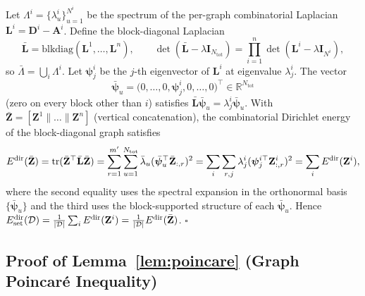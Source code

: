 Let $\Lambda^i=\{\lambda^i_u\}_{u=1}^{N^i}$ be the spectrum of the per-graph combinatorial Laplacian $\mathbf{L}^i=\mathbf{D}^i-\mathbf{A}^i$. Define the block-diagonal Laplacian
\begin{equation}
\bar{\mathbf{L}}=\mathrm{blkdiag}(\mathbf{L}^1,\dots,\mathbf{L}^n),\qquad \det(\bar{\mathbf{L}}-\lambda\mathbf{I}_{N_{\text{tot}}})=\prod_{i=1}^n\det(\mathbf{L}^i-\lambda\mathbf{I}_{N^i}),
\end{equation}
so $\bar{\Lambda}=\bigcup_i\Lambda^i$. Let $\bm{\psi}^i_j$ be the $j$-th eigenvector of $\mathbf{L}^i$ at eigenvalue $\lambda^i_j$. The vector
\begin{equation}
\bar{\bm{\psi}}_u=\bigl(0,\dots,0,\bm{\psi}^i_j,0,\dots,0\bigr)^\top\in\mathbb{R}^{N_{\text{tot}}}
\end{equation}
(zero on every block other than $i$) satisfies $\bar{\mathbf{L}}\bar{\bm{\psi}}_u=\lambda^i_j\bar{\bm{\psi}}_u$. With $\bar{\mathbf{Z}}=[\mathbf{Z}^1\|\dots\|\mathbf{Z}^n]$ (vertical concatenation), the combinatorial Dirichlet energy of the block-diagonal graph satisfies
\begin{equation}
E^{\text{dir}}(\bar{\mathbf{Z}})=\mathrm{tr}(\bar{\mathbf{Z}}^\top\bar{\mathbf{L}}\bar{\mathbf{Z}})=\sum_{r=1}^{m'}\sum_{u=1}^{N_{\text{tot}}}\bar{\lambda}_u(\bar{\bm{\psi}}_u^\top\bar{\mathbf{Z}}_{:,r})^2
=\sum_i\sum_{r,j}\lambda^i_j(\bm{\psi}^{i\top}_j\mathbf{Z}^i_{:,r})^2=\sum_iE^{\text{dir}}(\mathbf{Z}^i),
\end{equation}
where the second equality uses the spectral expansion in the orthonormal basis $\{\bar{\bm{\psi}}_u\}$ and the third uses the block-supported structure of each $\bar{\bm{\psi}}_u$. Hence $E^{\text{dir}}_{\text{set}}(\mathcal{D})=\frac{1}{|\mathcal{D}|}\sum_iE^{\text{dir}}(\mathbf{Z}^i)=\frac{1}{|\mathcal{D}|}E^{\text{dir}}(\bar{\mathbf{Z}})$. $\square$

\subsection{Proof of Lemma~\ref{lem:poincare} (Graph Poincar\'e Inequality)}


